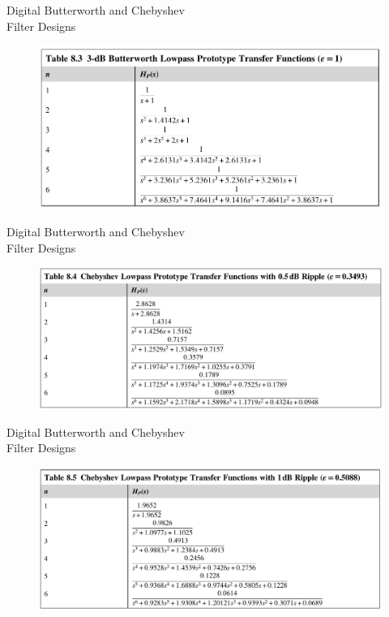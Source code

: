 \documentclass[pdflatex,compress,mathserif]{beamer}
\begin{document}
\begin{frame}{Digital Butterworth and Chebyshev\\Filter Designs}
    \begin{figure}
        \centering
        \includegraphics[width=\linewidth]{./img/img13.png}
    \end{figure}
\end{frame}

\begin{frame}{Digital Butterworth and Chebyshev\\Filter Designs}
    \begin{figure}
        \centering
        \includegraphics[width=\linewidth]{./img/img14.png}
    \end{figure}
\end{frame}

\begin{frame}{Digital Butterworth and Chebyshev\\Filter Designs}
    \begin{figure}
        \centering
        \includegraphics[width=\linewidth]{./img/img15.png}
    \end{figure}
\end{frame}
\end{document}
